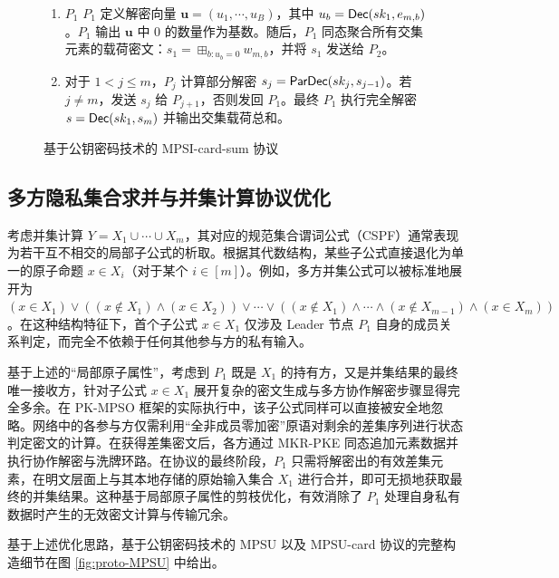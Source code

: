 \begin{figure}[!htb]
\begin{framed}
\begin{minipage}[c]{\textwidth}
\begin{trivlist}
\begin{enumerate}[itemsep=2pt,topsep=0pt,parsep=0pt]
\begin{enumerate}[itemsep=2pt,topsep=0pt,parsep=0pt]
        \end{enumerate}
    \item $P_{1}$ $P_{1}$ 定义解密向量 $\textbf{u} = (u_1, \cdots, u_{B})$，其中 $u_b = \mathsf{Dec}(sk_1,e_{m,b})$。$P_1$ 输出 $\textbf{u}$ 中 0 的数量作为基数。随后，$P_1$ 同态聚合所有交集元素的载荷密文：$s_1 = \boxplus_{b: u_b = 0} w_{m,b}$，并将 $s_1$ 发送给 $P_2$。
    \item 对于 $1 < j \le m$，$P_j$ 计算部分解密 $s_j = \mathsf{ParDec}(sk_j, s_{j-1})$。若 $j \ne m$，发送 $s_j$ 给 $P_{j+1}$，否则发回 $P_1$。最终 $P_1$ 执行完全解密 $s = \mathsf{Dec}(sk_1, s_m)$ 并输出交集载荷总和。
\end{enumerate}

\end{trivlist}
\end{minipage}
\end{framed}
\caption{基于公钥密码技术的 MPSI-card-sum 协议}\label{fig:proto-MPSI-Sum}
\end{figure}

\subsection{多方隐私集合求并与并集计算协议优化}

考虑并集计算 $Y = X_1 \cup \cdots \cup X_m$，其对应的规范集合谓词公式（CSPF）通常表现为若干互不相交的局部子公式的析取。根据其代数结构，某些子公式直接退化为单一的原子命题 $x \in X_i$（对于某个 $i \in [m]$）。例如，多方并集公式可以被标准地展开为 $(x \in X_1) \lor ((x \notin X_1) \land (x \in X_2)) \lor \cdots \lor ((x \notin X_1) \land \cdots \land (x \notin X_{m-1}) \land (x \in X_m))$。在这种结构特征下，首个子公式 $x \in X_1$ 仅涉及 Leader 节点 $P_1$ 自身的成员关系判定，而完全不依赖于任何其他参与方的私有输入。

基于上述的“局部原子属性”，考虑到 $P_1$ 既是 $X_1$ 的持有方，又是并集结果的最终唯一接收方，针对子公式 $x \in X_1$ 展开复杂的密文生成与多方协作解密步骤显得完全多余。在 PK-MPSO 框架的实际执行中，该子公式同样可以直接被安全地忽略。网络中的各参与方仅需利用“全非成员零加密”原语对剩余的差集序列进行状态判定密文的计算。在获得差集密文后，各方通过 MKR-PKE 同态追加元素数据并执行协作解密与洗牌环路。在协议的最终阶段，$P_1$ 只需将解密出的有效差集元素，在明文层面上与其本地存储的原始输入集合 $X_1$ 进行合并，即可无损地获取最终的并集结果。这种基于局部原子属性的剪枝优化，有效消除了 $P_1$ 处理自身私有数据时产生的无效密文计算与传输冗余。

基于上述优化思路，基于公钥密码技术的 MPSU 以及 MPSU-card 协议的完整构造细节在图 \ref{fig:proto-MPSU} 中给出。

